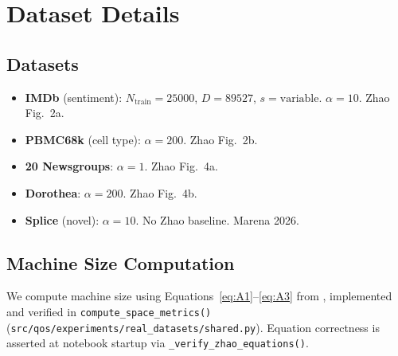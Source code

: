 \section{Dataset Details}
\label{app:datasets}

\subsection{Datasets}
\begin{itemize}
  \item \textbf{IMDb} (sentiment): $N_{\text{train}}=25000$, $D=89527$, $s=\text{variable}$. $\alpha=10$. Zhao Fig.~2a.
  \item \textbf{PBMC68k} (cell type): $\alpha=200$. Zhao Fig.~2b.
  \item \textbf{20 Newsgroups}: $\alpha=1$. Zhao Fig.~4a.
  \item \textbf{Dorothea}: $\alpha=200$. Zhao Fig.~4b.
  \item \textbf{Splice} (novel): $\alpha=10$. No Zhao baseline. Marena 2026.
\end{itemize}

\subsection{Machine Size Computation}
We compute machine size using Equations~\eqref{eq:A1}--\eqref{eq:A3}
from \Zhao, implemented and verified in \texttt{compute\_space\_metrics()}
(\texttt{src/qos/experiments/real\_datasets/shared.py}).
Equation correctness is asserted at notebook startup via
\texttt{\_verify\_zhao\_equations()}.

